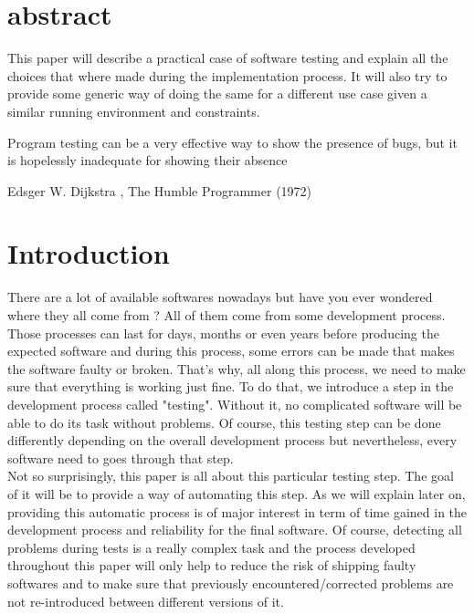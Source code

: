 \documentclass[12pt]{article}
\theoremstyle{definition}
\theoremstyle{definition}
\begin{document}



\section*{abstract}

This paper will describe a practical case of software testing and explain all the choices that where made during the implementation process. It will also try to provide some generic way of doing the same for a different use case given a similar running environment and constraints.

\clearpage
\pagebreak
\hspace{0pt}
\vfill
\epigraph{Program testing can be a very effective way to show the presence of bugs, but it is hopelessly inadequate for showing their absence}{Edsger W. Dijkstra , The Humble Programmer (1972)}
\vfill
\hspace{0pt}
\pagebreak

\clearpage

\tableofcontents

\clearpage

\section{Introduction}

There are a lot of available softwares nowadays but have you ever wondered where they all come from ? All of them come from some development process. Those processes can last for days, months or even years before producing the expected software and during this process, some errors can be made that makes the software faulty or broken. That's why, all along this process, we need to make sure that everything is working just fine. To do that, we introduce a step in the development process called "testing". Without it, no complicated software will be able to do its task without problems. Of course, this testing step can be done differently depending on the overall development process but nevertheless, every software need to goes through that step.\\

Not so surprisingly, this paper is all about this particular testing step. The goal of it will be to provide a way of automating this step. As we will explain later on, providing this automatic process is of major interest in term of time gained in the development process and reliability for the final software. Of course, detecting all problems during tests is a really complex task and the process developed throughout this paper will only help to reduce the risk of shipping faulty softwares and to make sure that previously encountered/corrected problems are not re-introduced between different versions of it.\\
\end{document}
